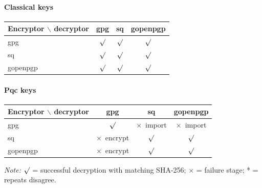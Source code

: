 

\paragraph{Classical keys}

\begin{tabular}{lccc}
\toprule
Encryptor $\backslash$ decryptor & gpg & sq & gopenpgp \\
\midrule
gpg & $\surd$ & $\surd$ & $\surd$ \\
sq & $\surd$ & $\surd$ & $\surd$ \\
gopenpgp & $\surd$ & $\surd$ & $\surd$ \\
\bottomrule
\end{tabular}


\paragraph{Pqc keys}

\begin{tabular}{lccc}
\toprule
Encryptor $\backslash$ decryptor & gpg & sq & gopenpgp \\
\midrule
gpg & $\surd$ & $\times$\ import & $\times$\ import \\
sq & $\times$\ encrypt & $\surd$ & $\surd$ \\
gopenpgp & $\times$\ encrypt & $\surd$ & $\surd$ \\
\bottomrule
\end{tabular}


\emph{Note:} $\surd$ = successful decryption with matching SHA-256; $\times$ = failure stage; * = repeats disagree.
